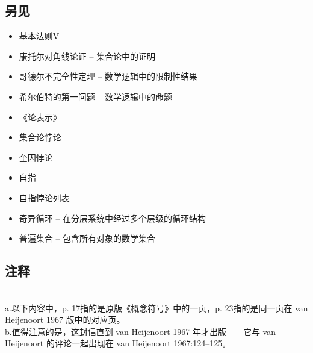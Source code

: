\subsection{另见}
\begin{itemize}
\item 基本法则V
\item 康托尔对角线论证 – 集合论中的证明
\item 哥德尔不完全性定理 – 数学逻辑中的限制性结果
\item 希尔伯特的第一问题 – 数学逻辑中的命题
\item 《论表示》
\item 集合论悖论
\item 奎因悖论
\item 自指
\item 自指悖论列表
\item 奇异循环 – 在分层系统中经过多个层级的循环结构
\item 普遍集合 – 包含所有对象的数学集合
\end{itemize}
\subsection{注释}\\
a.以下内容中，p. 17指的是原版《概念符号》中的一页，p. 23指的是同一页在 van Heijenoort 1967 版中的对应页。\\
b.值得注意的是，这封信直到 van Heijenoort 1967 年才出版——它与 van Heijenoort 的评论一起出现在 van Heijenoort 1967:124–125。
